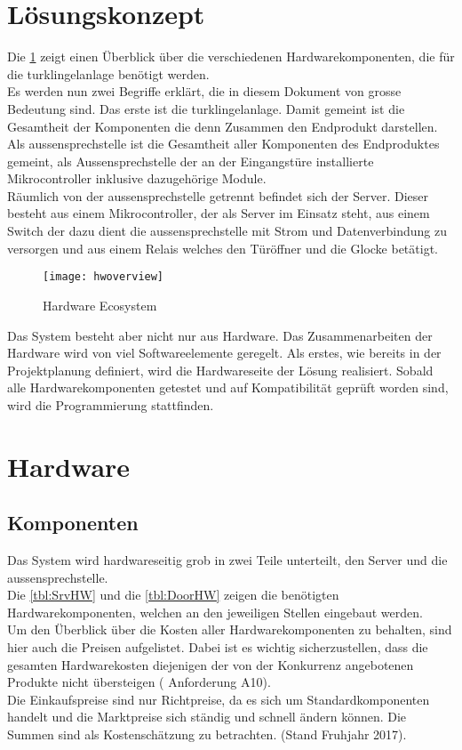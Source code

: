 \section{Lösungskonzept}
\label{sec:lösungskonzept}
Die \cref{fig:hwoverview} zeigt einen Überblick über die verschiedenen Hardwarekomponenten, die für die \gls{turklingelanlage} benötigt werden.
\\
Es werden nun zwei Begriffe erklärt, die in diesem Dokument von grosse Bedeutung sind. Das erste ist die \gls{turklingelanlage}. Damit gemeint ist die Gesamtheit der Komponenten die denn Zusammen den Endprodukt darstellen.
\\
Als \gls{aussensprechstelle} ist die Gesamtheit aller Komponenten des Endproduktes gemeint, als Aussensprechstelle der an der Eingangstüre installierte Mikrocontroller inklusive dazugehörige Module.
\\
Räumlich von der \gls{aussensprechstelle} getrennt befindet sich der Server. Dieser besteht aus einem Mikrocontroller, der als Server im Einsatz steht, aus einem Switch der dazu dient die \gls{aussensprechstelle} mit Strom und Datenverbindung zu versorgen und aus einem Relais welches den Türöffner und die Glocke betätigt.
\begin{figure}[htb!]
	\begin{center}
		\texttt{[image: hwoverview]}
		\caption[Hardware Ecosystem]{Hardware Ecosystem}
		\label{fig:hwoverview}
	\end{center}
\end{figure}
Das System besteht aber nicht nur aus Hardware. Das Zusammenarbeiten der Hardware wird von viel Softwareelemente geregelt. Als erstes, wie bereits in der Projektplanung definiert, wird die Hardwareseite der Lösung realisiert. Sobald alle Hardwarekomponenten getestet und auf Kompatibilität geprüft worden sind, wird die Programmierung stattfinden.
\newpage

\section{Hardware}
\label{sec:chapterexample}
\subsection{Komponenten}
Das System wird hardwareseitig grob in zwei Teile unterteilt, den Server und die \gls{aussensprechstelle}.
\\
Die \cref{tbl:SrvHW} und die \cref{tbl:DoorHW} zeigen die benötigten Hardwarekomponenten, welchen an den jeweiligen Stellen eingebaut werden.
\\
Um den Überblick über die Kosten aller Hardwarekomponenten zu behalten, sind hier auch die Preisen aufgelistet. Dabei ist es wichtig sicherzustellen, dass die gesamten Hardwarekosten diejenigen der von der Konkurrenz angebotenen Produkte nicht übersteigen ( Anforderung A10).
\\
Die Einkaufspreise sind nur Richtpreise, da es sich um Standardkomponenten handelt und die Marktpreise sich ständig und schnell ändern können. Die Summen sind als Kostenschätzung zu betrachten. (Stand Fruhjahr 2017).

